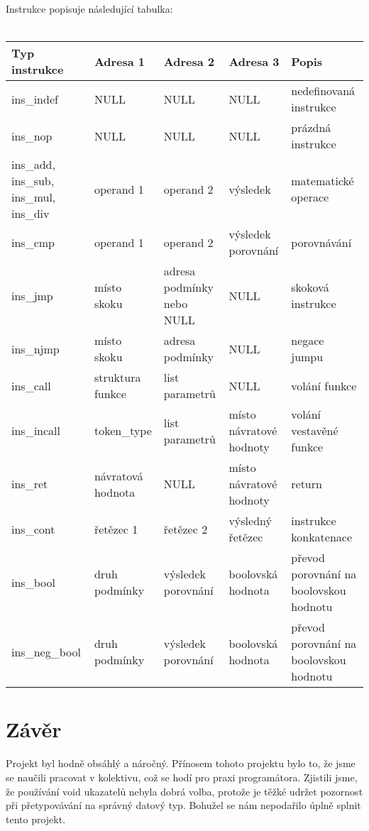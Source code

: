 \documentclass[12pt,a4paper,titlepage,final]{article}
\begin{document}
Instrukce popisuje následující tabulka:\\\\
\scriptsize
\begin{tabular}{|p{2.15cm}|l|l|l|p{3cm}|}
	\hline 
	 {\bf Typ instrukce} & {\bf Adresa 1} & {\bf Adresa 2} & {\bf Adresa 3} & {\bf Popis}\\
	 \hline \hline
	 ins\_indef & NULL & NULL & NULL & nedefinovaná instrukce \\
	 \hline
	 ins\_nop & NULL & NULL & NULL & prázdná instrukce \\
	 \hline
	 ins\_add, ins\_sub, ins\_mul, ins\_div & operand 1 & operand 2 & výsledek & matematické operace \\
	 \hline 
	 ins\_cmp & operand 1 & operand 2 & výsledek porovnání & porovnávání \\
	 \hline
	 ins\_jmp & místo skoku & adresa podmínky nebo NULL & NULL & skoková instrukce \\
	 \hline
	 ins\_njmp & místo skoku & adresa podmínky & NULL & negace jumpu \\
	 \hline
	 ins\_call & struktura funkce & list parametrů & NULL & volání funkce \\
	 \hline
	 ins\_incall & token\_type & list parametrů & místo návratové hodnoty & volání vestavěné funkce \\
	 \hline
	 ins\_ret & návratová hodnota & NULL & místo návratové hodnoty & return \\
	 \hline
	 ins\_cont & řetězec 1 & řetězec 2 & výsledný řetězec & instrukce konkatenace \\
	 \hline
	 ins\_bool & druh podmínky & výsledek porovnání & boolovská hodnota & převod porovnání na boolovskou hodnotu \\
	 \hline
	 ins\_neg\_bool & druh podmínky & výsledek porovnání & boolovská hodnota & převod porovnání na boolovskou hodnotu \\
	 \hline 
\end{tabular}
\normalsize


\section{Závěr} \label{zaver}
Projekt byl hodně obsáhlý a náročný. Přínosem tohoto projektu bylo to, že jsme se naučili pracovat v kolektivu, což se hodí pro praxi programátora. Zjistili jsme, že používání void ukazatelů nebyla dobrá volba, protože je těžké udržet pozornost při přetypovávání na správný datový typ. Bohužel se nám nepodařilo úplně splnit tento projekt. 
\end{document}
